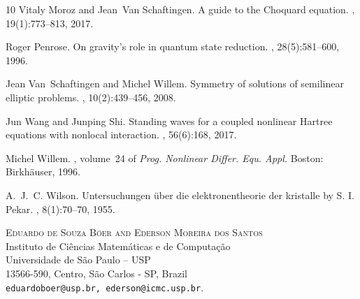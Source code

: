 \documentclass[12pt,a4paper]{article}
\numberwithin{equation}{section}
\begin{document}
\begin{thebibliography}{10}
Vitaly Moroz and Jean~Van Schaftingen.
\newblock A guide to the {C}hoquard equation.
, 19(1):773--813,
  2017.

Roger Penrose.
\newblock On gravity's role in quantum state reduction.
, 28(5):581--600, 1996.

Jean Van~Schaftingen and Michel Willem.
\newblock Symmetry of solutions of semilinear elliptic problems.
, 10(2):439--456, 2008.

Jun Wang and Junping Shi.
\newblock Standing waves for a coupled nonlinear {H}artree equations with
  nonlocal interaction.
,
  56(6):168, 2017.

Michel Willem.
, volume~24 of {\em Prog. Nonlinear Differ.
  Equ. Appl.}
\newblock Boston: Birkh{\"a}user, 1996.

A.~J.~C. Wilson.
\newblock Untersuchungen über die elektronentheorie der kristalle by {S}. {I}.
  {P}ekar.
, 8(1):70--70, 1955.

\end{thebibliography}



\vspace{1cm}
\noindent\textsc{Eduardo de Souza B\"oer and Ederson Moreira dos Santos}\\
Instituto de Ci\^encias Matem\'aticas e de Computa\c c\~ao\\
Universidade de S\~ao Paulo -- USP\\
13566-590, Centro, S\~ao Carlos - SP, Brazil\\
\noindent\texttt{eduardoboer@usp.br, ederson@icmc.usp.br}.
\end{document}
